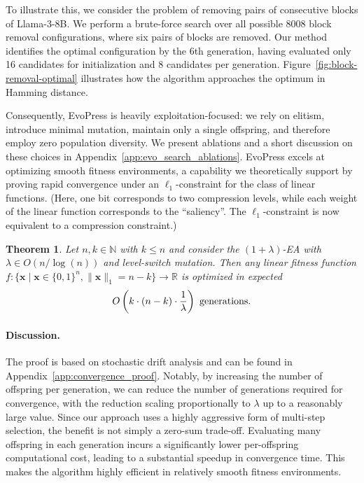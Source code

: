 \documentclass{article}
\theoremstyle{plain}
\newtheorem{theorem}{Theorem}[section]
\theoremstyle{definition}
\theoremstyle{remark}
\newcommand{\olea}{$(1 + \lambda)$-EA\xspace}
\newcommand{\oplea}{\olea}
\newcommand{\methodname}{EvoPress}
\begin{document}
To illustrate this, we consider the problem of removing pairs of consecutive blocks of Llama-3-8B. We perform a brute-force search over all possible $8008$ block removal configurations, where six pairs of blocks are removed. Our method identifies the optimal configuration by the 6th generation, having evaluated only 16 candidates for initialization and 8 candidates per generation. Figure~\ref{fig:block-removal-optimal} illustrates how the algorithm approaches the optimum in Hamming distance. 

Consequently, \methodname{} is heavily exploitation-focused: we rely on elitism, introduce minimal mutation, maintain only a single offspring, and therefore employ zero population diversity. 
We present ablations and a short discussion on these choices in Appendix~\ref{app:evo_search_ablations}. 
\methodname{} excels at optimizing smooth fitness environments, a capability we theoretically support by proving rapid convergence under an $\ell_1$-constraint for the class of linear functions. (Here, one bit corresponds to two compression levels, while each weight of the linear function corresponds to the ``saliency''. The $\ell_1$-constraint is now equivalent to a compression constraint.)
\begin{theorem}\label{theo:multipleOffspring}
    Let $n,k \in \mathbb{N}$ with $k \le n$ and consider the \oplea with $\lambda \in O(n/\log(n))$ and level-switch mutation. Then any linear fitness function  $f: \{\mathbf{x}\;|\; \mathbf{x} \in \{0,1\}^n, \| \mathbf{x} \|_1=n-k \} \rightarrow \mathbb{R}$ is optimized in expected  
    \begin{displaymath}
        O\left(k\cdot (n-k) \cdot \frac{1}{\lambda}\right) \textnormal{ generations.}
    \end{displaymath}
\end{theorem}

\paragraph{Discussion.} The proof is based on stochastic drift analysis and can be found in Appendix~\ref{app:convergence_proof}.
 Notably, by increasing the number of offspring per generation, we can reduce the number of generations required for convergence, with the reduction scaling proportionally to $\lambda$ up to a reasonably large value. Since our approach uses a highly aggressive form of multi-step selection, the benefit is not simply a zero-sum trade-off. Evaluating many offspring in each generation incurs a significantly lower per-offspring computational cost, leading to a substantial speedup in convergence time. This makes the algorithm highly efficient in relatively smooth fitness environments.
\end{document}
